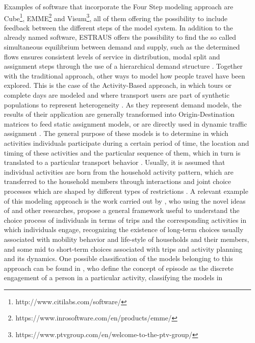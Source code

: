 \documentclass[Journal,letterpaper]{ascelike-new}
\begin{document}
Examples of software that incorporate the Four Step modeling approach are Cube\footnote{http://www.citilabs.com/software/}, EMME\footnote{https://www.inrosoftware.com/en/products/emme/} and Visum\footnote{https://www.ptvgroup.com/en/welcome-to-the-ptv-group/}, all of them offering the possibility to include feedback between the different steps of the model system. In addition to the already named software, ESTRAUS offers the possibility to find the so called simultaneous equilibrium between demand and supply, such as the determined flows ensures consistent levels of service in distribution, modal split and assignment steps through the use of a hierarchical demand structure \citep{ESTRAUS}.
Together with the traditional approach, other ways to model how people travel have been explored. This is the case of the Activity-Based approach, in which tours or complete days are modeled and where transport users are part of synthetic populations to represent heterogeneity \citep{flugel2014evaluation}. As they represent demand models, the results of their application are generally transformed into Origin-Destination matrices to feed static assignment models, or are directly used in dynamic traffic assignment \citep{lin2008integration}. The general purpose of these models is to determine in which activities individuals participate during a certain period of time, the location and timing of these activities and the particular sequence of them, which in turn is translated to a particular transport behavior \citep{Ettema96}. Usually, it is assumed that individual activities are born from the household activity pattern, which are transferred to the household members through interactions and joint choice processes which are shaped by different types of restrictions \citep{McNallyAndRindt2008}.  A relevant example of this modeling approach is the work carried out by \cite{Mosh-1996}, who using the novel ideas of \cite{hagerstraand1970people} and other researches, propose a general framework useful to understand the choice process of individuals in terms of trips and the corresponding activities in which individuals engage, recognizing the existence of long-term choices usually associated with mobility behavior and life-style of households and their members, and some mid to short-term choices associated with trips and activity planning and its dynamics.
One possible classification of the models belonging to this approach can be found in \cite{Bhat2003}, who define the concept of episode as the discrete engagement of a person in a particular activity, classifying the models in
\end{document}
